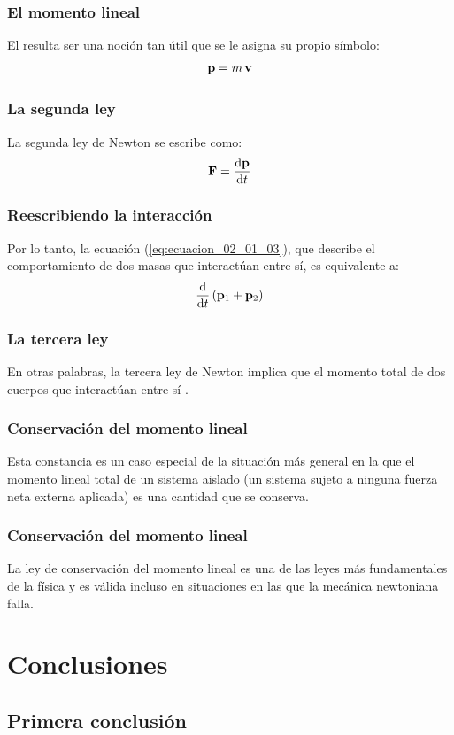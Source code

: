 \documentclass[12pt]{beamer}
\begin{document}
\begin{frame}
\frametitle{El momento lineal}
El  resulta ser una noción tan útil que se le asigna su propio símbolo:
\pause
\begin{align}
  \vb{p} = m \, \vb{v}
  \label{eq:ecuacion_02_01_08}
\end{align}
\end{frame}
\begin{frame}
\frametitle{La segunda ley}
La segunda ley de Newton se escribe como:
\begin{align}
  \vb{F} = \dv{\vb{p}}{t}
  \label{eq:ecuacion_02_01_09}
\end{align}
\end{frame}
\begin{frame}
\frametitle{Reescribiendo la interacción}
Por lo tanto, la ecuación (\ref{eq:ecuacion_02_01_03}), que describe el comportamiento de dos masas que interactúan entre sí, es equivalente a:
\begin{align}
  \dv{t} \left( \vb{p}_{1} + \vb{p}_{2} \right)
  \label{eq:ecuacion_02_01_10}
\end{align}
\end{frame}
\begin{frame}
\frametitle{La tercera ley}
En otras palabras, la tercera ley de Newton implica que el momento total de dos cuerpos que interactúan entre sí .
\end{frame}
\begin{frame}
\frametitle{Conservación del momento lineal}
Esta constancia es un caso especial de la situación más general en la que el momento lineal total de un sistema aislado (un sistema sujeto a ninguna fuerza neta externa aplicada) es una cantidad que se conserva.
\end{frame}
\begin{frame}
\frametitle{Conservación del momento lineal}
La ley de conservación del momento lineal es una de las leyes más fundamentales de la física y es válida incluso en situaciones en las que la mecánica newtoniana falla.
\end{frame}

\section{Conclusiones}
\subsection{Primera conclusión}
\end{document}
